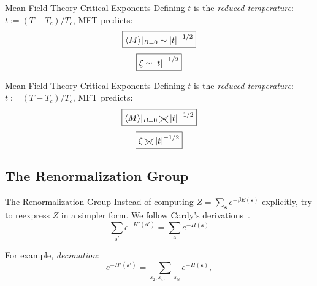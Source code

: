\documentclass{beamer}
\newcommand{\bolds}[1]{\boldsymbol{#1}}
\newcommand{\expect}[1]{\langle{}{#1}\rangle{}}
\newcommand{\bs}{\bolds{s}}
\renewcommand{\b}{\beta}
\begin{document}
\begin{frame}{Mean-Field Theory Critical Exponents}
  Defining $t$ is the \textit{reduced temperature}: $t:=(T-T_c)/T_c$,
  MFT predicts:
  \begin{equation*}%
    \boxed{\expect{M}\rvert_{B=0}\sim\abs{t}^{-1/2}}
  \end{equation*}%
  \begin{equation*}%
\boxed{\xi\sim\abs{t}^{-1/2}}
  \end{equation*}%
\end{frame}

\begin{frame}{Mean-Field Theory Critical Exponents}
  Defining $t$ is the \textit{reduced temperature}: $t:=(T-T_c)/T_c$,
  MFT predicts:
  \begin{equation*}%
    \boxed{\expect{M}\rvert_{B=0}\ \xcancel{\sim}\ \abs{t}^{-1/2}}
  \end{equation*}%
  \begin{equation*}%
\boxed{\xi\ \xcancel{\sim}\ \abs{t}^{-1/2}}
  \end{equation*}%
\end{frame}

\subsection{The Renormalization Group}
\begin{frame}{The Renormalization Group}
  Instead of computing $Z=\sum_{\bs}e^{-\b E(\bs)}$ explicitly, try to
  reexpress $Z$ in a simpler form. We follow Cardy's derivations~\cite{cardy}.
  \begin{equation*}%
    \boxed{\sum_{\bs'}e^{-H'(\bs')}=\sum_{\bs}e^{-H(\bs)}}
  \end{equation*}%

  For example, \textit{decimation}:
  \begin{equation*}%
    e^{-H'(\bs')}=\sum_{s_2,s_4,\ldots,s_N} e^{-H(\bs)},
  \end{equation*}%
\end{frame}

\end{document}

